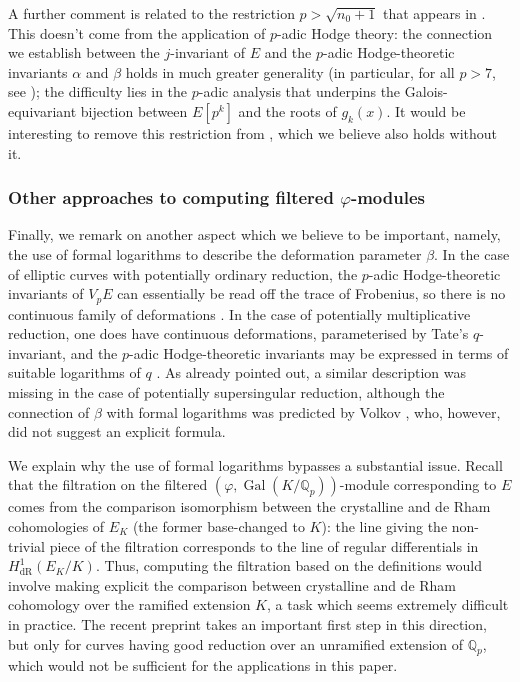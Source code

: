\documentclass{amsart}
\newcommand{\op}[1]{\operatorname{#1}}
\theoremstyle{definition}
\newcommand{\Q}{\mathbb{Q}}
\numberwithin{theorem}{section}
\numberwithin{equation}{section}
\begin{document}
A further comment is related to the restriction $p>\sqrt{n_0+1}$ that appears in . This doesn't come from the application of $p$-adic Hodge theory: the connection we establish between the $j$-invariant of $E$ and the $p$-adic Hodge-theoretic invariants $\alpha$ and $\beta$ holds in much greater generality (in particular, for all $p>7$, see ); the difficulty lies in the $p$-adic analysis that underpins the Galois-equivariant bijection between $E[p^k]$ and the roots of $g_k(x)$. It would be interesting to remove this restriction from , which we believe also holds without it.

\subsubsection*{Other approaches to computing filtered $\varphi$-modules}
Finally, we remark on another aspect which we believe to be important, namely, the use of formal logarithms to describe the deformation parameter $\beta$. In the case of elliptic curves with potentially ordinary reduction, the $p$-adic Hodge-theoretic invariants of $V_pE$ can essentially be read off the trace of Frobenius, so there is no continuous family of deformations \cite[p.~111]{Volkov}.
In the case of potentially multiplicative reduction, one does have continuous deformations, parameterised by Tate's $q$-invariant, and the $p$-adic Hodge-theoretic invariants may be expressed in terms of suitable logarithms of $q$ \cite[p.~107]{Volkov}. As already pointed out, a similar description was missing in the case of potentially supersingular reduction, although the connection of $\beta$ with formal logarithms was predicted by Volkov \cite[Remarque on p.~133]{Volkov}, who, however, did not suggest an explicit formula.

We explain why the use of formal logarithms bypasses a substantial issue. Recall that the filtration on the filtered $(\varphi, \op{Gal}(K/\Q_p))$-module corresponding to $E$ comes from the comparison isomorphism between the crystalline and de Rham cohomologies of $E_K$ (the former base-changed to $K$): the line giving the non-trivial piece of the filtration corresponds to the line of regular differentials in $H^1_{\operatorname{dR}}(E_K/K)$. Thus, computing the filtration based on the definitions would involve making explicit the comparison between crystalline and de Rham cohomology over the ramified extension $K$, a task which seems extremely difficult in practice. The recent preprint \cite{booher2026computingcrystallinecohomologypdivisible} takes an important first step in this direction, but only for curves having good reduction over an unramified extension of $\Q_p$, which would not be sufficient for the applications in this paper.
\end{document}
